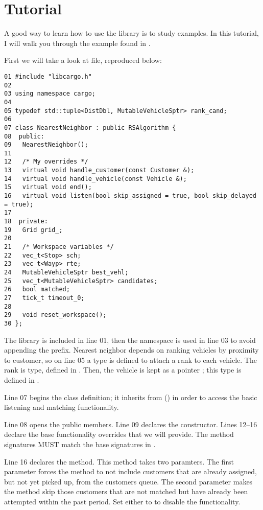\section{Tutorial}

A good way to learn how to use the library is to study examples. In this
tutorial, I will walk you through the  example found in
.

First we will take a look at  file, reproduced below:
\begin{verbatim}
01 #include "libcargo.h"
02
03 using namespace cargo;
04
05 typedef std::tuple<DistDbl, MutableVehicleSptr> rank_cand;
06
07 class NearestNeighbor : public RSAlgorithm {
08  public:
09   NearestNeighbor();
11
12   /* My overrides */
13   virtual void handle_customer(const Customer &);
14   virtual void handle_vehicle(const Vehicle &);
15   virtual void end();
16   virtual void listen(bool skip_assigned = true, bool skip_delayed = true);
17
18  private:
19   Grid grid_;
20
21   /* Workspace variables */
22   vec_t<Stop> sch;
23   vec_t<Wayp> rte;
24   MutableVehicleSptr best_vehl;
25   vec_t<MutableVehicleSptr> candidates;
26   bool matched;
27   tick_t timeout_0;
28
29   void reset_workspace();
30 };
\end{verbatim}

The library is included in line 01, then the namespace is used in line 03 to
avoid appending the  prefix. Nearest neighbor depends on ranking
vehicles by proximity to customer, so on line 05 a type is defined to attach
a rank to each vehicle. The rank is  type, defined in
. Then, the vehicle is kept as a pointer
; this type is defined in .

Line 07 begins the  class definition; it inherits from
 () in order to access the
basic listening and matching functionality.

Line 08 opens the public members. Line 09 declares the constructor. Lines
12--16 declare the base functionality overrides that we will provide. The
method signatures MUST match the base signatures in .

Line 16 declares the  method. This method takes two paramters.
The first parameter forces the method to not include customers that are already
assigned, but not yet picked up, from the customers queue. The second
parameter makes the method skip those customers that are not matched but have
already been attempted within the past  period. Set either to
 to disable the functionality.



